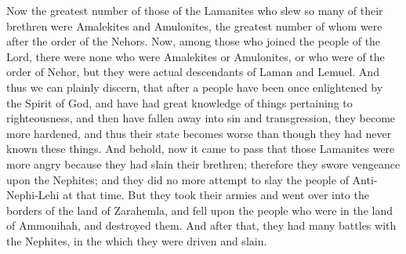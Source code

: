 \bverse \iffalse Now the greatest number of those of the Lamanites who slew so many of their brethren were Amalekites and Amulonites, the greatest number of whom were after the order of the Nehors. \fi
Now the greatest number of those of the Lamanites who slew so many of their brethren were Amalekites and Amulonites, the greatest number of whom were after the order of the Nehors.
\bverse \iffalse Now, among those who joined the people of the Lord, there were none who were Amalekites or Amulonites, or who were of the order of Nehor, but they were actual descendants of Laman and Lemuel. \fi
Now, among those who joined the people of the Lord, there were none who were Amalekites or Amulonites, or who were of the order of Nehor, but they were actual descendants of Laman and Lemuel.
\bverse \iffalse And thus we can plainly discern, that after a people have been once enlightened by the Spirit of God, and have had great knowledge of things pertaining to righteousness, and then have fallen away into sin and transgression, they become more hardened, and thus their state becomes worse than though they had never known these things. \fi
And thus we can plainly discern, that after a people have been once enlightened by the Spirit of God, and have had great knowledge of things pertaining to righteousness, and then have fallen away into sin and transgression, they become more hardened, and thus their state becomes worse than though they had never known these things.
\bchapter
\bverse \iffalse And behold, now it came to pass that those Lamanites were more angry because they had slain their brethren; therefore they swore vengeance upon the Nephites; and they did no more attempt to slay the people of Anti-Nephi-Lehi at that time. \fi
And behold, now it came to pass that those Lamanites were more angry because they had slain their brethren; therefore they swore vengeance upon the Nephites; and they did no more attempt to slay the people of Anti-Nephi-Lehi at that time.
\bverse \iffalse But they took their armies and went over into the borders of the land of Zarahemla, and fell upon the people who were in the land of Ammonihah, and destroyed them. \fi
But they took their armies and went over into the borders of the land of Zarahemla, and fell upon the people who were in the land of Ammonihah, and destroyed them.
\bverse \iffalse And after that, they had many battles with the Nephites, in the which they were driven and slain. \fi
And after that, they had many battles with the Nephites, in the which they were driven and slain.
